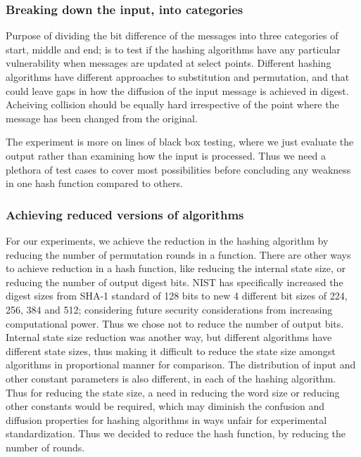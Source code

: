 \subsubsection{Breaking down the input, into categories}
Purpose of dividing the bit difference of the messages into three categories of start, middle and end; is to test
if the hashing algorithms have any particular vulnerability when messages are updated at select points. Different
hashing algorithms have different approaches to substitution and permutation, and that could leave gaps in how
the diffusion of the input message is achieved in digest. Acheiving collision should be equally hard irrespective
of the point where the message has been changed from the original.

The experiment is more on lines of black box testing, where we just evaluate the output rather than examining
how the input is processed. Thus we need a plethora of test cases to cover most possibilities before concluding
any weakness in one hash function compared to others. 

\subsubsection{Achieving reduced versions of algorithms}
For our experiments, we achieve the reduction in the hashing algorithm by reducing the number of permutation
rounds in a function. There are other ways to achieve reduction in a hash function, like reducing the internal
state size, or reducing the number of output digest bits. NIST has specifically increased the digest sizes from
SHA-1 standard of 128 bits to new 4 different bit sizes of 224, 256, 384 and 512; considering future security
considerations from increasing computational power. Thus we chose not to reduce the number of output bits.
Internal state size reduction was another way, but different algorithms have different state sizes, thus making
it difficult to reduce the state size amongst algorithms in proportional manner for comparison. The
distribution of input and other constant parameters is also different, in each of the hashing algorithm. Thus
for reducing the state size, a need in reducing the word size or reducing other constants would be required,
which may diminish the confusion and diffusion properties for hashing algorithms in ways unfair for experimental
standardization. Thus we decided to reduce the hash function, by reducing the number of rounds.


